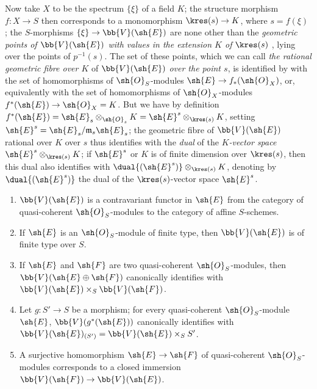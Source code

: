 \begin{env}[1.7.10]
\label{II.1.7.10}
Now take $X$ to be the spectrum $\{\xi\}$ of a field $K$; the structure morphism $f:X\to S$ then corresponds to a monomorphism $\kres(s)\to K$, where $s=f(\xi)$ ; the $S$-morphisms $\{\xi\}\to\bb{V}(\sh{E})$ are none other than the \emph{geometric points of $\bb{V}(\sh{E})$ with values in the extension $K$ of $\kres(s)$} , lying over the points of $p^{-1}(s)$.
The set of these points, which we can call \emph{the rational geometric fibre over $K$} of $\bb{V}(\sh{E})$ \emph{over the point $s$}, is identified by  with the set of homomorphisms of $\sh{O}_S$-modules $\sh{E}\to f_*(\sh{O}_X)$, or, equivalently  with the set of homomorphisms of $\sh{O}_X$-modules $f^*(\sh{E})\to\sh{O}_X=K$.
But we have by definition  $f^*(\sh{E})=\sh{E}_s\otimes_{\sh{O}_s}K=\sh{E}^s\otimes_{\kres(s)}K$, setting $\sh{E}^s=\sh{E}_s/\mathfrak{m}_s\sh{E}_s$; the geometric fibre of $\bb{V}(\sh{E})$ rational over $K$ over $s$ thus identifies with the \emph{dual} of the \emph{$K$-vector space $\sh{E}^s\otimes_{\kres(s)}K$}; if $\sh{E}^s$ or $K$ is of finite dimension over $\kres(s)$, then this dual also identifies with $\dual{(\sh{E}^s)}\otimes_{\kres(s)}K$, denoting by $\dual{(\sh{E}^s)}$ the dual of the $\kres(s)$-vector space $\sh{E}^s$.
\end{env}

\begin{proposition}[1.7.11]
\label{II.1.7.11}
\medskip\noindent
\begin{enumerate}
  \item[{\rm(i)}] $\bb{V}(\sh{E})$ is a contravariant functor in $\sh{E}$ from the category of quasi-coherent $\sh{O}_S$-modules to the category of affine $S$-schemes.
  \item[{\rm(ii)}] If $\sh{E}$ is an $\sh{O}_S$-module of finite type, then $\bb{V}(\sh{E})$ is of finite type over $S$.
  \item[{\rm(iii)}] If $\sh{E}$ and $\sh{F}$ are two quasi-coherent $\sh{O}_S$-modules, then $\bb{V}(\sh{E}\oplus\sh{F})$ canonically identifies with $\bb{V}(\sh{E})\times_S\bb{V}(\sh{F})$.
  \item[{\rm(iv)}] Let $g:S'\to S$ be a morphism; for every quasi-coherent $\sh{O}_S$-module $\sh{E}$, $\bb{V}(g^*(\sh{E}))$ canonically identifies with $\bb{V}(\sh{E})_{(S')}=\bb{V}(\sh{E})\times_S S'$.
  \item[{\rm(v)}] A surjective homomorphism $\sh{E}\to\sh{F}$ of quasi-coherent $\sh{O}_S$-modules corresponds to a closed immersion $\bb{V}(\sh{F})\to\bb{V}(\sh{E})$.
\end{enumerate}
\end{proposition}

